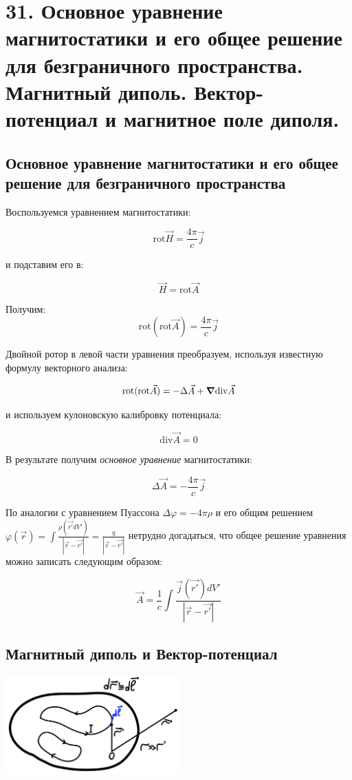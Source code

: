 \section*{31. Основное уравнение магнитостатики и его общее решение для
безграничного пространства. Магнитный диполь. Вектор-потенциал и
магнитное поле диполя.}
 
\subsection*{Основное уравнение магнитостатики и его общее решение для
безграничного пространства}

Воспользуемся уравнением магнитостатики:

\[
\mathrm{rot}\vec{H}=\frac{4\pi}{c}\vec{j}  
\]

и подставим его в:

\[
\vec{H}=\mathrm{rot}\vec{A}
\]

Получим:
\[
\mathrm{rot}(\mathrm{rot}\vec{A} )=\frac{4\pi}{c}\vec{j}  
\]

Двойной ротор в левой части уравнения преобразуем, используя известную формулу векторного анализа:

\[
\mathrm{rot}(\mathrm{rot}\vec{A} )=-\Delta \vec{A}+ \grad \mathrm{div}\vec{A} 
\]

и используем кулоновскую калибровку потенциала:

\[
\mathrm{div}\vec{A}=0 
\]

В результате получим \textit {основное уравнение} магнитостатики:

\[
\boxed{\Delta \vec{A}=-\frac{4\pi}{c}\vec{j} }
\]

По аналогии с уравнением Пуассона $\Delta\varphi=-4\pi\rho$ и его общим решением $\varphi(\vec{r})=\int \frac{\rho(\vec{r'}dV')}{|\vec{r}-\vec{r'}|}=\frac{q}{|\vec{r}-\vec{r'}|}$ нетрудно догадаться, что общее решение уравнения можно записать следующим образом:

\[
\boxed{\vec{A}=\frac{1}{c}\int \frac{\vec{j}(\vec{r'})dV'}{|\vec{r}-\vec{r'}|}  }
\]

\subsection*{Магнитный диполь и Вектор-потенциал }

\begin{center}
    \includegraphics[width=0.5\textwidth]{im/69.png}
\end{center}

